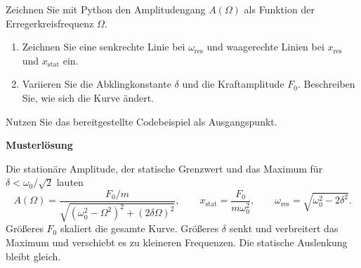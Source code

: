 \begin{ExerciseBlock}
Zeichnen Sie mit Python den Amplitudengang $A(\Omega)$ als Funktion der Erregerkreisfrequenz $\Omega$.
\begin{enumerate}
\item Zeichnen Sie eine senkrechte Linie bei $\omega_\mathrm{res}$ und waagerechte Linien bei $x_\mathrm{res}$ und $x_\mathrm{stat}$ ein.
\item Variieren Sie die Abklingkonstante $\delta$ und die Kraftamplitude $F_0$. Beschreiben Sie, wie sich die Kurve ändert.
\end{enumerate}
Nutzen Sie das bereitgestellte Codebeispiel als Ausgangspunkt.
\end{ExerciseBlock}
\begin{Solution}
\par\medskip\noindent\textbf{Musterlösung}\par\nopagebreak[4]
Die stationäre Amplitude, der statische Grenzwert und das Maximum für $\delta<\omega_0/\sqrt2$ lauten
\[
 A(\Omega)=\frac{F_0/m}{\sqrt{(\omega_0^2-\Omega^2)^2+(2\delta\Omega)^2}},
 \qquad
 x_\mathrm{stat}=\frac{F_0}{m\omega_0^2},
 \qquad
 \omega_\mathrm{res}=\sqrt{\omega_0^2-2\delta^2}.
\]
Größeres $F_0$ skaliert die gesamte Kurve. Größeres $\delta$ senkt und verbreitert das Maximum und verschiebt es zu kleineren Frequenzen. Die statische Auslenkung bleibt gleich.
\end{Solution}
